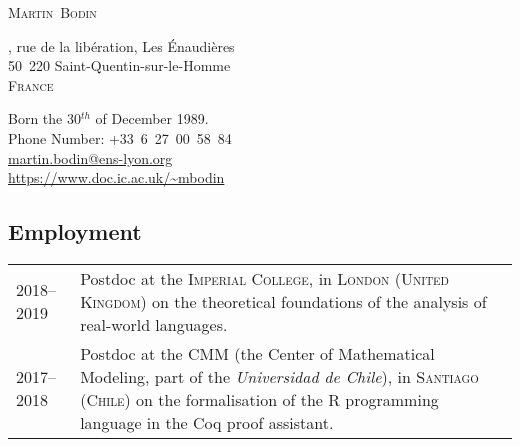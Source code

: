 \documentclass[12pt,a4paper]{article}
\makeatletter
\newcommand{\es}[1]{\foreignlanguage{spanish}{\textit{#1}}}
\newenvironment{datecvsection}[1]%
               {\subsection*{#1}%
                 \noindent \begin{tabular}{@{}p{\annee}p{\texte}@{}}}
               {\end{tabular}}
\makeatother
\begin{document}
\pagestyle{empty}


\newlength{\annee}
\settowidth{\annee}{9999—9999} %


\newlength{\texte}
\setlength{\texte}{\textwidth} \addtolength{\texte}{-\annee} 
	\addtolength{\texte}{-2\tabcolsep}

\begin{center} \Huge \textsc{Martin~Bodin} \end{center}

\parbox{0.5\textwidth}
{
  , rue de la libération,
  Les Énaudières \\
  50~220 Saint-Quentin-sur-le-Homme \\
  \textsc{France}
}
\parbox{.55\textwidth}
{
\begin{flushright}
  Born the 30\(^{th}\) of December 1989. \\
  \noindent Phone Number: \mbox{+33 6 27 00 58 84} \\
  \url{martin.bodin@ens-lyon.org} \\
  \url{https://www.doc.ic.ac.uk/~mbodin}
\end{flushright}
}


\begin{datecvsection}{Employment}

    2018–2019 & Postdoc at the \textsc{Imperial College}, in \textsc{London} (\textsc{United Kingdom}) on the theoretical foundations of the analysis of real-world languages. \\

    2017–2018 & Postdoc at the \textsc{CMM} (the Center of Mathematical Modeling, part of the \es{Universidad de Chile}), in \textsc{Santiago} (\textsc{Chile}) on the formalisation of the R programming language in the Coq proof assistant. \\

\end{datecvsection}
\end{document}
